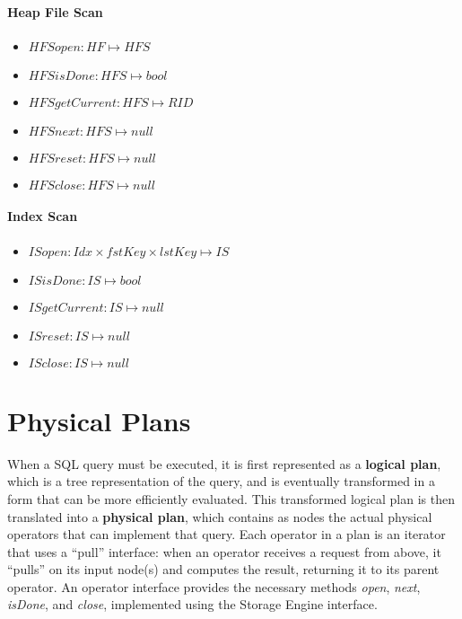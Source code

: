 \paragraph{Heap File Scan}

\begin{itemize}
    \item $HFSopen : HF \mapsto HFS$

    \item $HFSisDone : HFS \mapsto bool$

    \item $HFSgetCurrent : HFS \mapsto RID$

    \item $HFSnext : HFS \mapsto null$

    \item $HFSreset : HFS \mapsto null$

    \item $HFSclose : HFS \mapsto null$
\end{itemize}

\paragraph{Index Scan}

\begin{itemize}
    \item $ISopen : Idx \times fstKey \times lstKey \mapsto IS$

    \item $ISisDone : IS \mapsto bool$

    \item $ISgetCurrent : IS \mapsto null$

    \item $ISreset : IS \mapsto null$

    \item $ISclose : IS \mapsto null$
\end{itemize}

\section{Physical Plans}

When a SQL query must be executed, it is first represented as a \textbf{logical plan}, which is a tree representation of the query, and is eventually transformed in a form that can be more efficiently evaluated. This transformed logical plan is then translated into a \textbf{physical plan}, which contains as nodes the actual physical operators that can implement that query. Each operator in a plan is an iterator that uses a ``pull'' interface: when an operator receives a request from above, it ``pulls'' on its input node(s) and computes the result, returning it to its parent operator. An operator interface provides the necessary methods \textit{open}, \textit{next}, \textit{isDone}, and \textit{close}, implemented using the Storage Engine interface.